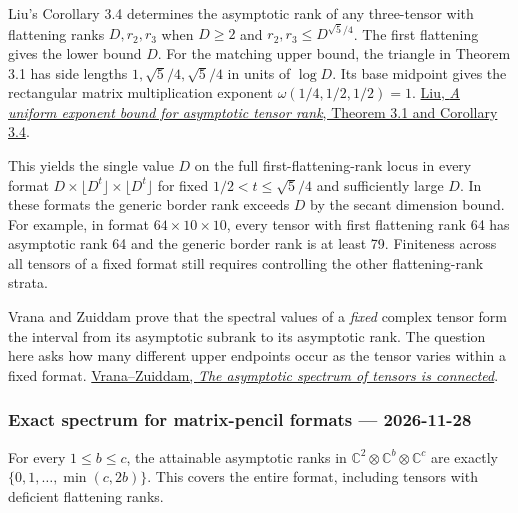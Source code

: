 \documentclass[11pt,a4paper]{article}
\begin{document}
Liu's Corollary 3.4 determines the asymptotic rank of any three-tensor
with flattening ranks \(D,r_2,r_3\) when \(D\ge2\) and
\(r_2,r_3\le D^{\sqrt5/4}\). The first flattening gives the lower bound
\(D\). For the matching upper bound, the triangle in Theorem 3.1 has
side lengths \(1,\sqrt5/4,\sqrt5/4\) in units of \(\log D\). Its base
midpoint gives the rectangular matrix multiplication exponent
\(\omega(1/4,1/2,1/2)=1\).
\href{https://hexagonmath.org/pdf/2611.00972v1}{Liu, \emph{A uniform
exponent bound for asymptotic tensor rank}, Theorem 3.1 and Corollary
3.4}.

This yields the single value \(D\) on the full first-flattening-rank
locus in every format
\(D\times\lfloor D^t\rfloor\times\lfloor D^t\rfloor\) for fixed
\(1/2< t\le\sqrt5/4\) and sufficiently large \(D\). In these formats the
generic border rank exceeds \(D\) by the secant dimension bound. For
example, in format \(64\times10\times10\), every tensor with first
flattening rank 64 has asymptotic rank 64 and the generic border rank is
at least 79. Finiteness across all tensors of a fixed format still
requires controlling the other flattening-rank strata.

Vrana and Zuiddam prove that the spectral values of a \emph{fixed}
complex tensor form the interval from its asymptotic subrank to its
asymptotic rank. The question here asks how many different upper
endpoints occur as the tensor varies within a fixed format.
\href{https://arxiv.org/abs/2611.34664v1}{Vrana--Zuiddam, \emph{The
asymptotic spectrum of tensors is connected}}.

\subsubsection{Exact spectrum for matrix-pencil formats ---
2026-11-28}\label{exact-spectrum-for-matrix-pencil-formats-2026-11-28}

For every \(1\le b\le c\), the attainable asymptotic ranks in
\(\mathbb C^2\otimes\mathbb C^b\otimes\mathbb C^c\) are exactly
\(\{0,1,\ldots,\min(c,2b)\}\). This covers the entire format, including
tensors with deficient flattening ranks.
\end{document}
